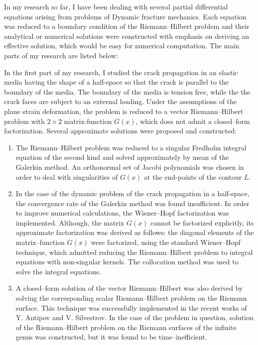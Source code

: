 \documentclass[11pt]{amsart}
\begin{document}
In my research so far, I have been dealing with several partial differential equations arising from problems of Dynamic fracture mechanics. Each equation was reduced to a boundary condition of the Riemann--Hilbert problem and their analytical or numerical solutions were constructed with emphasis on deriving an effective solution, which would be easy for numerical computation. The main parts of my research are listed below:

In the first part of my research, I studied the crack propagation in an elastic media having the shape of a half-space so that the crack is parallel to the boundary of the media. The boundary of the media is tension free, while the the crack faces are subject to an external loading. Under the assumptions of the plane strain deformation, the problem is reduced to a vector Riemann--Hilbert problem with $2\times2$ matrix-function $G(x)$, which does not admit a closed--form factorization. Several approximate solutions were proposed and constructed:
\begin{enumerate}
	\item The Riemann--Hilbert problem was reduced to a singular Fredholm integral equation of the second kind and solved approximately by mean of the Galerkin method. An orthonormal set of Jacobi polynomials was chosen in order to deal with singularities of $G(x)$ at the end-points of the contour $L$.
    \item In the case of the dynamic problem of the crack propagation in a half-space, the convergence rate of the Galerkin method was found insufficient. In order to improve numerical calculations, the Wiener--Hopf factorization was implemented. Although, the matrix $G(x)$ cannot be factorized explicitly, its approximate factorization was derived as follows: the diagonal elements of the matrix--function $G(x)$ were factorized, using the standard Wiener--Hopf technique, which admitted reducing the Riemann--Hilbert problem to integral equations with non-singular kernels. The collocation method was used to solve the integral equations.
    \item A closed--form solution of the vector Riemann--Hilbert was also derived by solving the corresponding scalar Riemann--Hilbert problem on the Riemann surface. This technique was successfully implemented in the recent works of Y. Antipov and V. Silvestrov. In the case of the problem in question, solution of the Riemann--Hilbert problem on the Riemann surfaces of the infinite genus was constructed, but it was found to be time--inefficient.
\end{enumerate}
\end{document}
